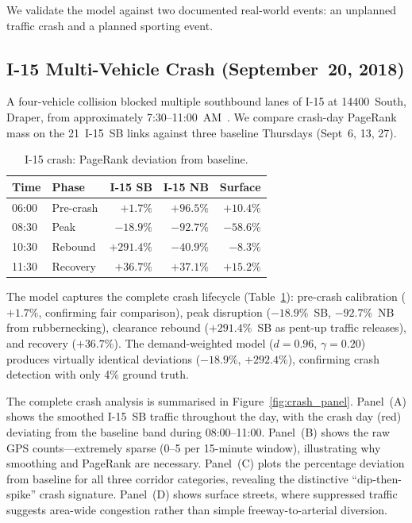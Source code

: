 \documentclass[11pt]{article}
\begin{document}
We validate the model against two documented real-world events:
an unplanned traffic crash and a planned sporting event.

\subsection{I-15 Multi-Vehicle Crash (September~20, 2018)}
\label{sec:crash}

A four-vehicle collision blocked multiple southbound lanes of I-15 at 14400~South, Draper, from approximately 7:30--11:00~AM~\cite{gephardtdaily2018}.
We compare crash-day PageRank mass on the 21~I-15~SB links against three baseline Thursdays (Sept~6, 13, 27).

\begin{table}[t]
\centering
\caption{I-15 crash: PageRank deviation from baseline.}
\label{tab:crash}
\small
\begin{tabular}{llrrr}
\toprule
Time & Phase & I-15 SB & I-15 NB & Surface \\
\midrule
06:00 & Pre-crash & $+1.7\%$ & $+96.5\%$ & $+10.4\%$ \\
08:30 & Peak & $\mathbf{-18.9\%}$ & $\mathbf{-92.7\%}$ & $-58.6\%$ \\
10:30 & Rebound & $\mathbf{+291.4\%}$ & $-40.9\%$ & $-8.3\%$ \\
11:30 & Recovery & $+36.7\%$ & $+37.1\%$ & $+15.2\%$ \\
\bottomrule
\end{tabular}
\end{table}

The model captures the complete crash lifecycle (Table~\ref{tab:crash}):
pre-crash calibration ($+1.7\%$, confirming fair comparison), peak disruption ($-18.9\%$~SB, $-92.7\%$~NB from rubbernecking), clearance rebound ($+291.4\%$~SB as pent-up traffic releases), and recovery ($+36.7\%$).
The demand-weighted model ($d = 0.96$, $\gamma = 0.20$) produces virtually identical deviations ($-18.9\%$, $+292.4\%$), confirming crash detection with only 4\% ground truth.

The complete crash analysis is summarised in Figure~\ref{fig:crash_panel}. Panel~(A) shows the smoothed I-15~SB traffic throughout the day, with the crash day (red) deviating from the baseline band during 08:00--11:00. Panel~(B) shows the raw GPS counts---extremely sparse (0--5 per 15-minute window), illustrating why smoothing and PageRank are necessary. Panel~(C) plots the percentage deviation from baseline for all three corridor categories, revealing the distinctive ``dip-then-spike'' crash signature. Panel~(D) shows surface streets, where suppressed traffic suggests area-wide congestion rather than simple freeway-to-arterial diversion.
\end{document}
